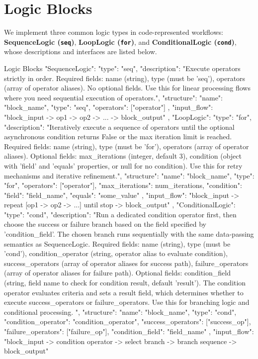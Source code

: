 \documentclass{article}
\theoremstyle{plain}
\theoremstyle{definition}
\theoremstyle{remark}
\begin{document}
\section{Logic Blocks}
\label{app:LogicBlocks}
We implement three common logic types in code-represented workflows: \textbf{SequenceLogic (\texttt{seq})}, \textbf{LoopLogic (\texttt{for})}, and \textbf{ConditionalLogic (\texttt{cond})}, whose descriptions and interfaces are listed below.
\begin{jsonblock}{Logic Blocks}
{
    "SequenceLogic": {
        "type": "seq",
        "description": "Execute operators strictly in order. Required fields: name (string), type (must be 'seq'), operators (array of operator aliases). No optional fields. Use this for linear processing flows where you need sequential execution of operators.",
        "structure": {
            "name": "block_name",
            "type": "seq",
            "operators": ["operator"]
        },
        "input_flow": "block_input -> op1 -> op2 -> ... -> block_output"
    },
    "LoopLogic": {
        "type": "for",
        "description": "Iteratively execute a sequence of operators until the optional asynchronous condition returns False or the max iteration limit is reached. Required fields: name (string), type (must be 'for'), operators (array of operator aliases). Optional fields: max_iterations (integer, default 3), condition (object with 'field' and 'equals' properties, or null for no condition). Use this for retry mechanisms and iterative refinement.",
        "structure": {
            "name": "block_name",
            "type": "for",
            "operators": ["operator"],
            "max_iterations": num_iterations,
            "condition": {
                "field": "field_name",
                "equals": "some_value" 
            }
        },
        "input_flow": "block_input -> repeat [op1 -> op2 -> ...] until stop -> block_output"
    },
    "ConditionalLogic": {
        "type": "cond",
        "description": "Run a dedicated condition operator first, then choose the success or failure branch based on the field specified by 'condition_field'. The chosen branch runs sequentially with the same data-passing semantics as SequenceLogic. Required fields: name (string), type (must be 'cond'), condition_operator (string, operator alias to evaluate condition), success_operators (array of operator aliases for success path), failure_operators (array of operator aliases for failure path). Optional fields: condition_field (string, field name to check for condition result, default 'result'). The condition operator evaluates criteria and sets a result field, which determines whether to execute success_operators or failure_operators. Use this for branching logic and conditional processing. ",
        "structure": {
            "name": "block_name",
            "type": "cond",
            "condition_operator": "condition_operator",
            "success_operators": ["success_op"],
            "failure_operators": ["failure_op"],
            "condition_field": "field_name"
        },
        "input_flow": "block_input -> condition operator -> select branch -> branch sequence -> block_output"
    }
}

\end{jsonblock}
\end{document}
